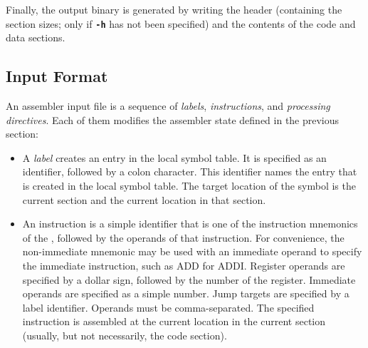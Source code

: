 Finally, the output binary is generated by writing the header (containing the section sizes; only if {\tt \bf -h} has not been specified) and the contents of the code and data sections.

\subsection{Input Format}

An assembler input file is a sequence of {\it labels}, {\it instructions}, and {\it processing directives}. Each of them modifies the assembler state defined in the previous section:
\begin{itemize}
\item A {\it label} creates an entry in the local symbol table. It is specified as an identifier, followed by a colon character. This identifier names the entry that is created in the local symbol table. The target location of the symbol is the current section and the current location in that section.
\item An instruction is a simple identifier that is one of the instruction mnemonics of the \ecox, followed by the operands of that instruction. For convenience, the non-immediate mnemonic may be used with an immediate operand to specify the immediate instruction, such as ADD for ADDI. Register operands are specified by a dollar sign, followed by the number of the register. Immediate operands are specified as a simple number. Jump targets are specified by a label identifier. Operands must be comma-separated. The specified instruction is assembled at the current location in the current section (usually, but not necessarily, the code section).


\end{itemize}
